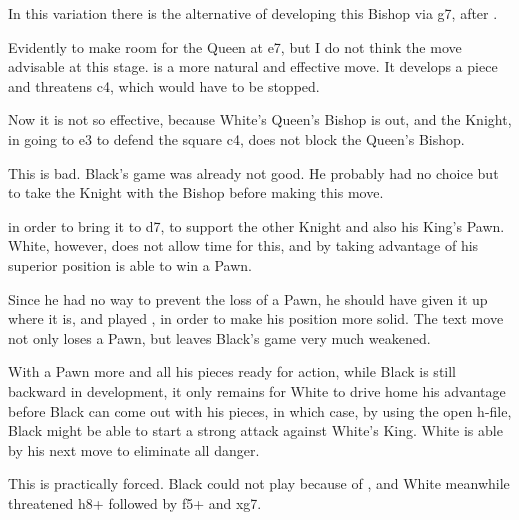 \documentclass[10pt,twoside]{article}
\begin{document}

In this variation there is the alternative of developing this Bishop via g7, after .


Evidently to make room for the Queen at e7, but I do not think the move advisable at this stage.  is a more natural and effective move. It develops a piece and threatens \figB c4, which would have to be stopped.


Now it is not so effective, because White's Queen's Bishop is out, and the Knight, in going to e3 to defend the square c4, does not block the Queen's Bishop.


This is bad. Black's game was already not good. He probably had no choice but to take the Knight with the Bishop before making this move.

\board


in order to bring it to d7, to support the other Knight and also his King's Pawn. White, however, does not allow time for this, and by taking advantage of his superior position is able to win a Pawn.


Since he had no way to prevent the loss of a Pawn, he should have given it up where it is, and played , in order to make his position more solid. The text move not only loses a Pawn, but leaves Black's game very much weakened.


\board

With a Pawn more and all his pieces ready for action, while Black is still backward in development, it only remains for White to drive home his advantage before Black can come out with his pieces, in which case, by using the open h-file, Black might be able to start a strong attack against White's King. White is able by his next move to eliminate all danger.


This is practically forced. Black could not play  because of , and White meanwhile threatened \figQ h8+ followed by \figN f5+ and \figQ xg7.
\end{document}
